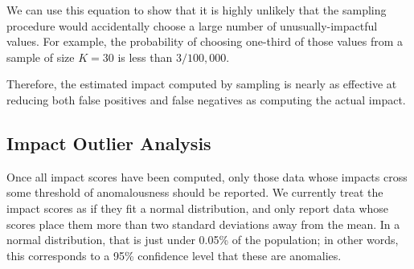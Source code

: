 We can use this equation to show that it is highly unlikely that the
sampling procedure would accidentally choose a large number of
unusually-impactful values. For example, the probability of choosing
one-third of those values from a sample of size $K = 30$ is less than
$3/100,000$.

Therefore, the estimated impact computed by sampling is
nearly as effective at reducing both false positives and false
negatives as computing the actual impact.



\subsection{Impact Outlier Analysis}
\label{sec:outlier_analysis}

Once all impact scores have been computed, only those data whose
impacts cross some threshold of anomalousness should be
reported. We currently treat the impact scores as if they fit a normal
distribution, and only report data whose scores place them more
than two standard deviations away from the mean. In a normal
distribution, that is just under 0.05\% of the population; in other
words, this corresponds to a 95\% confidence level that these are
anomalies.

